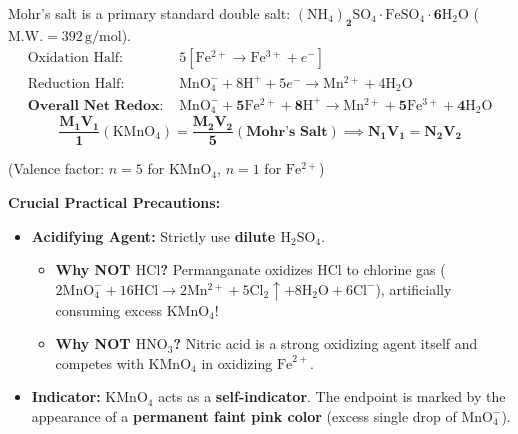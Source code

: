 \documentclass[10pt,a4paper]{article}
\begin{document}
\begin{formulabox}
Mohr's salt is a primary standard double salt: $\mathbf{(\mathrm{NH_4})_2\mathrm{SO_4}\cdot\mathrm{FeSO_4}\cdot 6\mathrm{H_2O}}$ ($\mathrm{M.W.} = 392\,\mathrm{g/mol}$).
\begin{align*}
  \text{Oxidation Half: } & 5[\mathrm{Fe^{2+}} \longrightarrow \mathrm{Fe^{3+}} + e^-]\\
  \text{Reduction Half: } & \mathrm{MnO_4^-} + 8\mathrm{H}^+ + 5e^- \longrightarrow \mathrm{Mn^{2+}} + 4\mathrm{H_2O}\\
  \textbf{Overall Net Redox: } & \mathbf{\mathrm{MnO_4^-} + 5\mathrm{Fe^{2+}} + 8\mathrm{H}^+ \longrightarrow \mathrm{Mn^{2+}} + 5\mathrm{Fe^{3+}} + 4\mathrm{H_2O}}
\end{align*}
\begin{equation}
  \mathbf{\frac{M_1 V_1}{1} (\mathrm{KMnO_4}) = \frac{M_2 V_2}{5} (\text{Mohr's Salt})} \implies \mathbf{N_1 V_1 = N_2 V_2}
\end{equation}
\centerline{\small (Valence factor: $n = 5$ for $\mathrm{KMnO_4}$, $n = 1$ for $\mathrm{Fe^{2+}}$)}

\textbf{Crucial Practical Precautions:}
\begin{itemize}
  \item \textbf{Acidifying Agent:} Strictly use \textbf{dilute $\mathrm{H_2SO_4}$}.
  \begin{itemize}
    \item \textbf{Why NOT $\mathrm{HCl}$?} Permanganate oxidizes $\mathrm{HCl}$ to chlorine gas ($2\mathrm{MnO_4^-} + 16\mathrm{HCl} \to 2\mathrm{Mn^{2+}} + 5\mathrm{Cl_2} \uparrow + 8\mathrm{H_2O} + 6\mathrm{Cl^-}$), artificially consuming excess $\mathrm{KMnO_4}$!
    \item \textbf{Why NOT $\mathrm{HNO}_3$?} Nitric acid is a strong oxidizing agent itself and competes with $\mathrm{KMnO_4}$ in oxidizing $\mathrm{Fe}^{2+}$.
  \end{itemize}
  \item \textbf{Indicator:} $\mathrm{KMnO_4}$ acts as a \textbf{self-indicator}. The endpoint is marked by the appearance of a \textbf{permanent faint pink color} (excess single drop of $\mathrm{MnO_4^-}$).
\end{itemize}
\end{formulabox}
\end{document}
